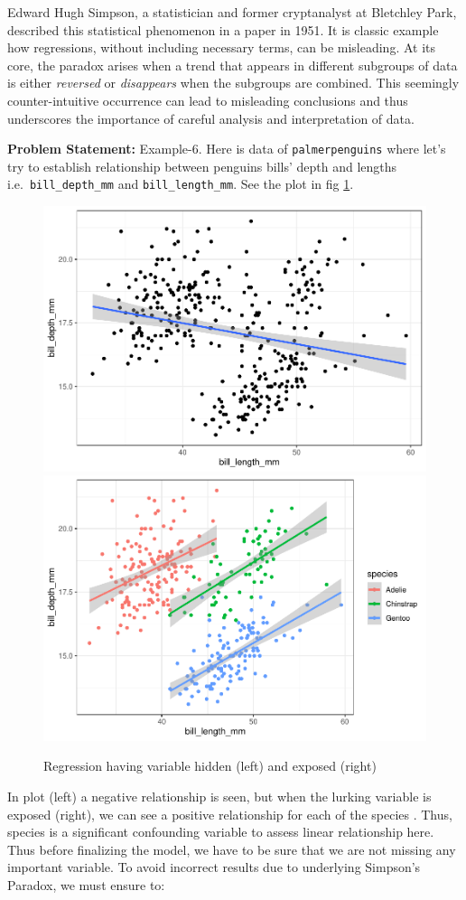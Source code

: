 \documentclass[
]{book}
\begin{document}
Edward Hugh Simpson, a statistician and former cryptanalyst at Bletchley Park, described this statistical phenomenon in a paper in 1951. It is classic example how regressions, without including necessary terms, can be misleading. At its core, the paradox arises when a trend that appears in different subgroups of data is either \emph{reversed} or \emph{disappears} when the subgroups are combined. This seemingly counter-intuitive occurrence can lead to misleading conclusions and thus underscores the importance of careful analysis and interpretation of data.

\textbf{Problem Statement:} Example-6. Here is data of \texttt{palmerpenguins} where let's try to establish relationship between penguins bills' depth and lengths i.e.~\texttt{bill\_depth\_mm} and \texttt{bill\_length\_mm}. See the plot in fig \ref{fig:ex3}.

\begin{figure}

{\centering \includegraphics[width=0.47\linewidth]{DauR_files/figure-latex/ex3-1} \includegraphics[width=0.47\linewidth]{DauR_files/figure-latex/ex3-2} 

}

\caption{Regression having variable hidden (left) and exposed (right)}\label{fig:ex3}
\end{figure}

In plot (left) a negative relationship is seen, but when the lurking variable is exposed (right), we can see a positive relationship for each of the species . Thus, species is a significant confounding variable to assess linear relationship here. Thus before finalizing the model, we have to be sure that we are not missing any important variable. To avoid incorrect results due to underlying Simpson's Paradox, we must ensure to:
\end{document}
